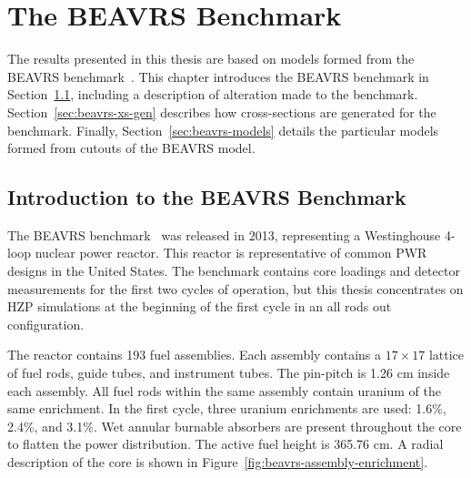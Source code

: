 \chapter{The BEAVRS Benchmark}
\label{chap:beavrs}

The results presented in this thesis are based on models formed from the BEAVRS benchmark~\cite{horelik2013beavrs}. This chapter introduces the BEAVRS benchmark in Section~\ref{sec:beavrs-intro}, including a description of alteration made to the benchmark. Section~\ref{sec:beavrs-xs-gen} describes how cross-sections are generated for the benchmark. Finally, Section~\ref{sec:beavrs-models} details the particular models formed from cutouts of the BEAVRS model.

\section{Introduction to the BEAVRS Benchmark}
\label{sec:beavrs-intro}

The BEAVRS benchmark~\cite{horelik2013beavrs} was released in 2013, representing a Westinghouse 4-loop nuclear power reactor. This reactor is representative of common \ac{PWR} designs in the United States. The benchmark contains core loadings and detector measurements for the first two cycles of operation, but this thesis concentrates on \ac{HZP} simulations at the beginning of the first cycle in an all rods out configuration.

The reactor contains 193 fuel assemblies. Each assembly contains a $17 \times 17$ lattice of fuel rods, guide tubes, and instrument tubes. The pin-pitch is 1.26 cm inside each assembly. All fuel rods within the same assembly contain uranium of the same enrichment. In the first cycle, three uranium enrichments are used: 1.6\%, 2.4\%, and 3.1\%. Wet annular burnable absorbers are present throughout the core to flatten the power distribution. The active fuel height is 365.76 cm. A radial description of the core is shown in Figure~\ref{fig:beavrs-assembly-enrichment}.

